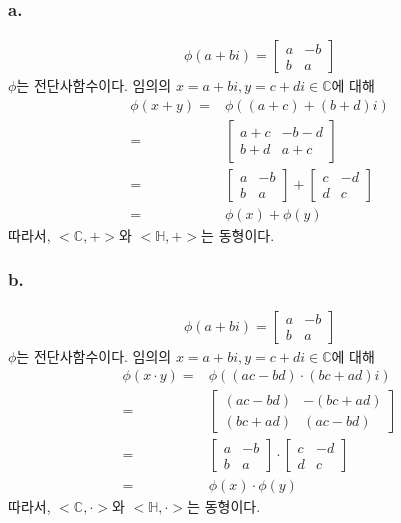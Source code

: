 \documentclass{article}
\begin{document}
\subsubsection{a.}
\begin{align*}
\phi(a+bi) = \begin{bmatrix}a & -b \\  b & a \end{bmatrix}
\end{align*}
$\phi$는 전단사함수이다. 임의의 $x = a+bi, y = c+di \in \mathbb{C}$에 대해
\begin{align*}
\phi(x + y) =& \phi((a+c) + (b+d)i)
\\ =& \begin{bmatrix}a+c & -b-d \\  b+d & a+c \end{bmatrix}
\\ =& \begin{bmatrix}a & -b \\  b & a \end{bmatrix} + \begin{bmatrix}c & -d \\  d & c \end{bmatrix}
\\ =& \phi(x) + \phi(y)
\end{align*}
따라서, $<\mathbb{C}, +>$와 $<\mathbb{H}, +>$는 동형이다.
\subsubsection{b.}
\begin{align*}
\phi(a+bi) = \begin{bmatrix}a & -b \\  b & a \end{bmatrix}
\end{align*}
$\phi$는 전단사함수이다. 임의의 $x = a+bi, y = c+di \in \mathbb{C}$에 대해
\begin{align*}
\phi(x \cdot y) =& \phi((ac-bd) \cdot (bc+ad)i)
\\ =& \begin{bmatrix}(ac-bd) & -(bc+ad) \\  (bc+ad) & (ac-bd) \end{bmatrix}
\\ =& \begin{bmatrix}a & -b \\  b & a \end{bmatrix} \cdot \begin{bmatrix}c & -d \\  d & c \end{bmatrix}
\\ =& \phi(x) \cdot \phi(y)
\end{align*}
따라서, $<\mathbb{C}, \cdot>$와 $<\mathbb{H}, \cdot>$는 동형이다.
\end{document}
